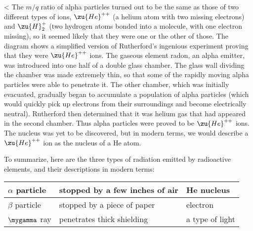 <%
        The $m/q$ ratio of alpha particles turned out to be the same
        as those of two different types of ions, $\zu{He}^{++}$ (a helium atom
        with two missing electrons) and $\zu{H}_2^+$ (two hydrogen atoms
        bonded into a molecule, with one electron missing), so it
        seemed likely that they were one or the other of those. The
        diagram shows a simplified version of Rutherford's ingenious
        experiment proving that they were $\zu{He}^{++}$ ions. The gaseous
        element radon, an alpha emitter, was introduced into one
        half of a double glass chamber. The glass wall dividing the
        chamber was made extremely thin, so that some of the rapidly
        moving alpha particles were able to penetrate it. The other
        chamber, which was initially evacuated, gradually began to
        accumulate a population of alpha particles (which would
        quickly pick up electrons from their surroundings and become
        electrically neutral). Rutherford then determined that it
        was helium gas that had appeared in the second chamber. Thus
        alpha particles were proved to be $\zu{He}^{++}$ ions. The nucleus was
        yet to be discovered, but in modern terms, we would describe
        a $\zu{He}^{++}$ ion as the nucleus of a He atom.         

        To summarize, here are the three types of radiation emitted
        by radioactive elements, and their descriptions in modern 
        terms:%

        \begin{tabular}{|l|l|l|}
                \hline
                $\alpha$ particle        &stopped by a few inches of air        &He nucleus\\
                \hline
                $\beta$ particle        &stopped by a piece of paper                &electron\\
                \hline
                $\mygamma$ ray        &penetrates thick shielding                &a type of light\\
                \hline
        \end{tabular}


